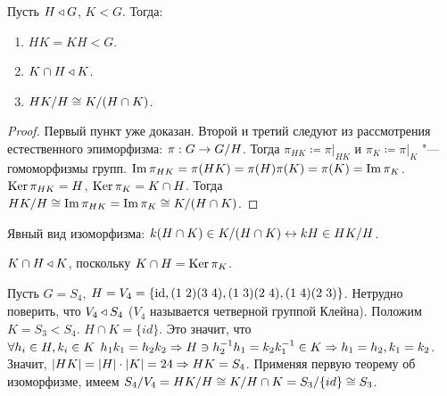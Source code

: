 \documentclass[main]{subfiles}
\begin{document}
\begin{theorem}
  Пусть $H \triangleleft G$, $K < G$. Тогда:
  \begin{enumerate}
    \item $HK = KH < G$.
    \item $K \cap H \triangleleft K$.
    \item $\Factor{HK}[H] \cong \Factor{K}[(H\cap K)]$.
  \end{enumerate}
\end{theorem}
\begin{proof}
  Первый пункт уже доказан. Второй и третий следуют из рассмотрения естественного
  эпиморфизма: $\pi : G \to \Factor{G}[H]$.
  Тогда $\pi_{HK} \coloneq \pi \bigr|_{HK}$ и
  $\pi_K \coloneq \pi \bigr|_K$ "--- гомоморфизмы групп.
  $\operatorname{Im} \pi_{HK} = \pi(HK) = \pi(H) \pi(K) = \pi(K) = \operatorname{Im} \pi_K$.
  $\operatorname{Ker} \pi_{HK} = H$, $\operatorname{Ker} \pi_K = K \cap H$.
  Тогда $\Factor{HK}[H] \cong \Img \pi_{HK} =
  \Img \pi_{K} \cong \Factor{K}[(H \cap K)]$.
\end{proof}

\begin{remark}
  Явный вид изоморфизма:
  $k(H \cap K) \in \Factor{K}[(H \cap K)]
  \otto kH \in \Factor{HK}[H]$.
\end{remark}

\begin{remark}
  $K \cap H \triangleleft K$, поскольку $K \cap H = \operatorname{Ker} \pi_K$.
\end{remark}

\begin{example}
  Пусть $G = S_4$,
  $H = V_4 = \{ \id, \Cycle{1&2}\Cycle{3&4},
  \Cycle{1&3}\Cycle{2&4}, \Cycle{1&4}\Cycle{2&3} \}$.
  Нетрудно поверить, что $V_4 \triangleleft S_4$
  ($V_4$ называется четверной группой Клейна).
  Положим $K = S_3 < S_4$.
  $H \cap K = \{ id \}$.
  Это значит, что
  $\forall {h _i \in H, k_i \in K} \; \,
  h_1 k_1 = h_2 k_2
  \Rightarrow H \ni h_2^{-1} h_1 = k_2 k_1^{-1} \in K
  \Rightarrow h_1 = h_2, k_1 = k_2$.
  Значит, $|HK| = |H| \cdot |K| = 24 \Rightarrow HK = S_4$.
  Применяя первую теорему об изоморфизме,
  имеем $\Factor{S_4}[V_4] = H\Factor{K}[H]
  \cong \Factor{K}[H\cap K] = \Factor{S_3}[\{id\}] \cong S_3$.
\end{example}
\end{document}
